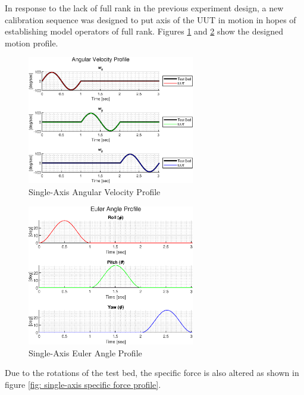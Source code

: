 In response to the lack of full rank in the previous experiment design, a new calibration sequence was designed to put axis of the UUT in motion in hopes of establishing model operators of full rank. Figures \ref{fig: single-axis angular velocity profile} and \ref{fig: single-axis euler angle profile} show the designed motion profile.

\begin{figure}[h] 
	\centering
	\includegraphics[width=0.65\textwidth]{./images/SAM_angular_velocity_profile.eps}
	\caption{Single-Axis Angular Velocity Profile}
	\label{fig: single-axis angular velocity profile}
\end{figure}
\FloatBarrier

\begin{figure}[h] 
	\centering
	\includegraphics[width=0.65\textwidth]{./images/SAM_euler_angle_profile.eps}
	\caption{Single-Axis Euler Angle Profile}
	\label{fig: single-axis euler angle profile}
\end{figure}
\FloatBarrier

Due to the rotations of the test bed, the specific force is also altered as shown in figure \ref{fig: single-axis specific force profile}.

